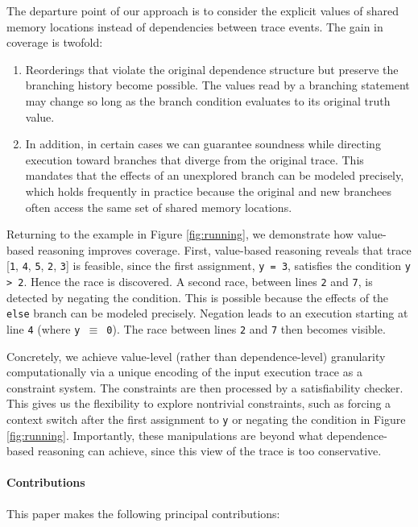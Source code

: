  The departure point of our approach is to consider the explicit values of shared memory locations instead of dependencies between trace events. The gain in coverage is twofold:
 \begin{enumerate}
 	\item Reorderings that violate the original dependence structure but preserve the branching history become possible. The values read by a branching statement may change so long as the branch condition evaluates to its original truth value.
 	\item In addition, in certain cases we can guarantee soundness while directing execution toward branches that diverge from the original trace. This mandates that the effects of an unexplored branch can be modeled precisely, which holds frequently in practice because the original and new branchees often access the same set of shared memory locations.
 \end{enumerate}
 
 Returning to the example in Figure \ref{fig:running}, we demonstrate how value-based reasoning improves coverage. First, value-based reasoning reveals that trace 
 [{\tt 1}, {\tt 4}, {\tt 5}, {\tt 2}, {\tt 3}] is feasible, since the first assignment, {\tt y = 3}, satisfies the condition {\tt y > 2}. Hence the race is discovered. A second race, between lines {\tt 2} and {\tt 7}, is detected by negating the condition. This is possible because the effects of the {\tt else} branch can be modeled precisely.
 Negation leads to an execution starting at line {\tt 4} (where {\tt y $\equiv$ 0}). The race between lines {\tt 2} and {\tt 7} then becomes visible.
 
 Concretely, we achieve value-level (rather than dependence-level) granularity computationally via a unique encoding of the input execution trace as a constraint system. The constraints are then processed by a satisfiability checker. This gives us the flexibility to explore nontrivial constraints, such as 
 forcing a context switch after the first assignment to {\tt y} or negating the condition in Figure \ref{fig:running}. Importantly, these manipulations are beyond what dependence-based reasoning can achieve, since this view of the trace is too conservative.
 
\paragraph{Contributions} This paper makes the following principal contributions:



